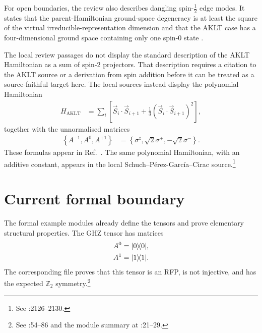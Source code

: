 \documentclass{article}
\begin{document}
For open boundaries, the review also describes dangling spin-$\tfrac12$ edge
modes. It states that the parent-Hamiltonian ground-space degeneracy is at least
the square of the virtual irreducible-representation dimension and that the
AKLT case has a four-dimensional ground space containing only one spin-$0$
state \cite[lines~1169--1174]{Cirac2021Matrix}.

The local review passages do not display the standard description of the AKLT
Hamiltonian as a sum of spin-$2$ projectors. That description requires a
citation to the AKLT source or a derivation from spin addition before it can be
treated as a source-faithful target here. The local sources instead display the
polynomial Hamiltonian
\begin{align}
    H_{\mathrm{AKLT}}
        &=
        \sum_i
        \left[\vec S_i\cdot\vec S_{i+1}
            +
            \frac{1}{3}
            \left(\vec S_i\cdot\vec S_{i+1}\right)^2\right],
    \label{eq:rmp_example_parent_hamiltonian_scope_aklt_polynomial}
\end{align}
together with the unnormalised matrices
\begin{align}
    \left\{A^{-1},A^0,A^{+1}\right\}
        &=
        \left\{\sigma^z,\sqrt{2}\sigma^+,-\sqrt{2}\sigma^-\right\}.
    \label{eq:rmp_example_parent_hamiltonian_scope_aklt_matrices}
\end{align}
These formulas appear in
Ref.~\cite[local TeX lines~340--349]{PerezGarcia2007MPSReps}. The same
polynomial Hamiltonian, with an additive constant, appears in the local
Schuch--P\'erez-Garc\'ia--Cirac source.\footnote{See
:2126--2130.}

\section{Current formal boundary}

The formal example modules already define the tensors and prove elementary
structural properties. The GHZ tensor has matrices
\begin{align}
    A^0
        &=
        |0\rangle\!\langle 0|,
    \label{eq:rmp_example_parent_hamiltonian_scope_formal_ghz_zero}\\
    A^1
        &=
        |1\rangle\!\langle 1|.
    \label{eq:rmp_example_parent_hamiltonian_scope_formal_ghz_one}
\end{align}
The corresponding file proves that this tensor is an RFP, is not injective, and
has the expected $\mathbb Z_2$ symmetry.\footnote{See
:54--86 and the module summary at
:21--29.}
\end{document}
